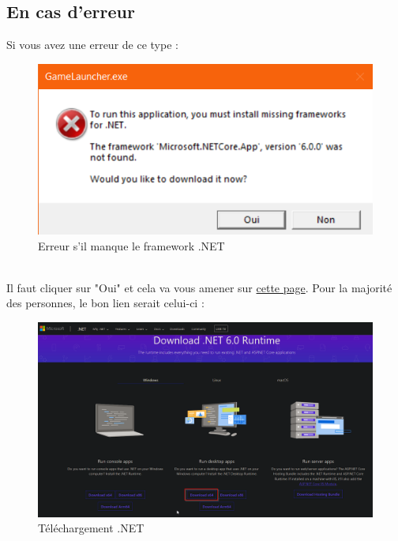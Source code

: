 \documentclass[a4paper, 10pt]{article}
\begin{document}
	\subsection{En cas d'erreur}
	Si vous avez une erreur de ce type : 
	\begin{figure}[ht]
		\centering
		\includegraphics[scale=0.5]{images/erreur.png}
		\caption{Erreur s'il manque le framework .NET}
	\end{figure}
	\\
	Il faut cliquer sur "Oui" et cela va vous amener sur \href{https://dotnet.microsoft.com/en-us/download/dotnet/6.0/runtime?cid=getdotnetcore}{cette page}.
	Pour la  majorité des personnes, le bon lien serait celui-ci : 
	\begin{figure}[ht]
		\centering
		\includegraphics[scale=0.4]{images/dotnet.png}
		\caption{Téléchargement .NET}
	\end{figure}
	
\end{document}
